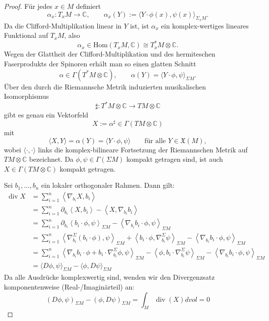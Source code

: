 \documentclass[10pt, letterpaper]{article}
\newcommand{\Hom}{\mathrm{Hom}}
\begin{document}
\begin{proof}
Für jedes $x\in M$ definiert
\[
\alpha_x:T_xM\to\mathbb C,\qquad
\alpha_x(Y):=\langle Y\cdot\phi(x),\psi(x)\rangle_{\Sigma_xM}.
\]
Da die Clifford-Multiplikation linear in $Y$ ist, ist $\alpha_x$ ein
komplex-wertiges lineares Funktional auf $T_xM$, also
\[
\alpha_x\in \Hom(T_xM,\mathbb C)\cong T_x^*M\otimes\mathbb C.
\]
Wegen der Glattheit der Clifford-Multiplikation und des hermiteschen
Faserprodukts der Spinoren erhält man so einen glatten Schnitt
\[
\alpha\in \Gamma(T^*M\otimes\mathbb C),\qquad
\alpha(Y)=\langle Y\cdot\phi,\psi\rangle_{\Sigma M}.
\]
Über den durch die Riemannsche Metrik induzierten musikalischen Isomorphismus
\[
\sharp:T^*M\otimes\mathbb C\to TM\otimes\mathbb C
\]
gibt es genau ein Vektorfeld
\[
X:=\alpha^\sharp\in \Gamma(TM\otimes\mathbb C)
\]
mit
\[
\langle X,Y\rangle=\alpha(Y)=\langle Y\cdot\phi,\psi\rangle
\qquad\text{für alle }Y\in \mathfrak X(M),
\]
wobei $\langle\cdot,\cdot\rangle$ links die komplex-bilineare Fortsetzung der
Riemannschen Metrik auf $TM\otimes\mathbb C$ bezeichnet.
Da $\phi,\psi\in \Gamma(\Sigma M)$ kompakt getragen sind, ist auch
$X\in \Gamma(TM\otimes\mathbb C)$ kompakt getragen.

Sei $b_1, \ldots, b_n$ ein lokaler orthogonaler Rahmen. Dann gilt:
$$
  \begin{aligned}
  \operatorname{div} X & =\sum_{i=1}^n\left\langle\nabla_{b_i} X, b_i\right\rangle \\
  & =\sum_{i=1}^n \partial_{b_i}\left\langle X, b_i\right\rangle-\left\langle X, \nabla_{b_i} b_i\right\rangle \\
  & =\sum_{i=1}^n \partial_{b_i}\left\langle b_i \cdot \phi, \psi\right\rangle_{\Sigma M}-\left\langle\nabla_{b_i} b_i \cdot \phi, \psi\right\rangle_{\Sigma M} \\
  & = \sum_{i=1}^n\left\langle\nabla_{b_i}^{\Sigma}\left(b_i \cdot \phi\right), \psi\right\rangle_{\Sigma M}+\left\langle b_i \cdot \phi, \nabla_{b_i}^{\Sigma} \psi\right\rangle_{\Sigma M}-\left\langle\nabla_{b_i} b_i \cdot \phi, \psi\right\rangle_{\Sigma M}\\
  & = \sum_{i=1}^n\left\langle\nabla_{b_i} b_i \cdot \phi+b_i \cdot \nabla_{b_i}^{\Sigma} \phi, \psi\right\rangle_{\Sigma M}-\left\langle\phi, b_i \cdot \nabla_{b_i}^{\Sigma} \psi\right\rangle_{\Sigma M}-\left\langle\nabla_{b_i} b_i \cdot \phi, \psi\right\rangle_{\Sigma M} \\ 
  & = \langle D \phi, \psi\rangle_{\Sigma M}-\langle\phi, D \psi\rangle_{\Sigma M}
  \end{aligned}
  $$
  Da alle Ausdrücke komplexwertig sind, wenden wir den Divergenzsatz komponentenweise (Real-/Imaginärteil) an:
  $$
  (D \phi, \psi)_{\Sigma M}-(\phi, D \psi)_{\Sigma M}=\int_M \operatorname{div}(X) d v o l=0
  $$
\end{proof}
\end{document}

